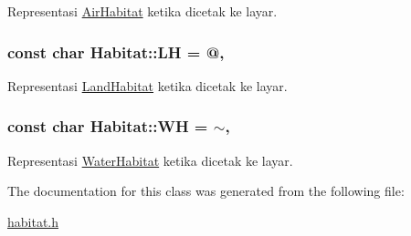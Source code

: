 Representasi \hyperlink{classAirHabitat}{Air\+Habitat} ketika dicetak ke layar. 

\subsubsection[{\texorpdfstring{LH}{LH}}]{\setlength{\rightskip}{0pt plus 5cm}const char Habitat\+::\+LH = \textquotesingle{}@\textquotesingle{}\hspace{0.3cm}{\ttfamily [static]}, {\ttfamily [protected]}}\hypertarget{classHabitat_a87fbedb46cde325396e3ef39350e14d7}{}\label{classHabitat_a87fbedb46cde325396e3ef39350e14d7}


Representasi \hyperlink{classLandHabitat}{Land\+Habitat} ketika dicetak ke layar. 

\subsubsection[{\texorpdfstring{WH}{WH}}]{\setlength{\rightskip}{0pt plus 5cm}const char Habitat\+::\+WH = \textquotesingle{}$\sim$\textquotesingle{}\hspace{0.3cm}{\ttfamily [static]}, {\ttfamily [protected]}}\hypertarget{classHabitat_aeba269066b13b0f7b632526af4d547d3}{}\label{classHabitat_aeba269066b13b0f7b632526af4d547d3}


Representasi \hyperlink{classWaterHabitat}{Water\+Habitat} ketika dicetak ke layar. 



The documentation for this class was generated from the following file\+:\begin{DoxyCompactItemize}
\item 
\hyperlink{habitat_8h}{habitat.\+h}\end{DoxyCompactItemize}

